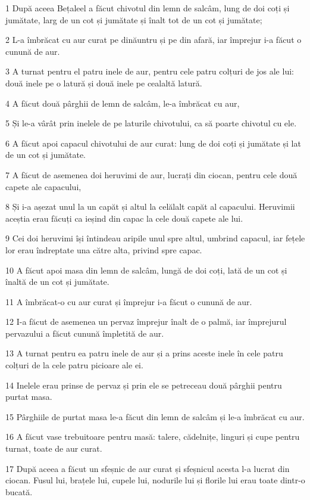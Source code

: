 \par 1 După aceea Bețaleel a făcut chivotul din lemn de salcâm, lung de doi coți și jumătate, larg de un cot și jumătate și înalt tot de un cot și jumătate;
\par 2 L-a îmbrăcat cu aur curat pe dinăuntru și pe din afară, iar împrejur i-a făcut o cunună de aur.
\par 3 A turnat pentru el patru inele de aur, pentru cele patru colțuri de jos ale lui: două inele pe o latură și două inele pe cealaltă latură.
\par 4 A făcut două pârghii de lemn de salcâm, le-a îmbrăcat cu aur,
\par 5 Și le-a vârât prin inelele de pe laturile chivotului, ca să poarte chivotul cu ele.
\par 6 A făcut apoi capacul chivotului de aur curat: lung de doi coți și jumătate și lat de un cot și jumătate.
\par 7 A făcut de asemenea doi heruvimi de aur, lucrați din ciocan, pentru cele două capete ale capacului,
\par 8 Și i-a așezat unul la un capăt și altul la celălalt capăt al capacului. Heruvimii aceștia erau făcuți ca ieșind din capac la cele două capete ale lui.
\par 9 Cei doi heruvimi își întindeau aripile unul spre altul, umbrind capacul, iar fețele lor erau îndreptate una către alta, privind spre capac.
\par 10 A făcut apoi masa din lemn de salcâm, lungă de doi coți, lată de un cot și înaltă de un cot și jumătate.
\par 11 A îmbrăcat-o cu aur curat și împrejur i-a făcut o cunună de aur.
\par 12 I-a făcut de asemenea un pervaz împrejur înalt de o palmă, iar împrejurul pervazului a făcut cunună împletită de aur.
\par 13 A turnat pentru ea patru inele de aur și a prins aceste inele în cele patru colțuri de la cele patru picioare ale ei.
\par 14 Inelele erau prinse de pervaz și prin ele se petreceau două pârghii pentru purtat masa.
\par 15 Pârghiile de purtat masa le-a făcut din lemn de salcâm și le-a îmbrăcat cu aur.
\par 16 A făcut vase trebuitoare pentru masă: talere, cădelnițe, linguri și cupe pentru turnat, toate de aur curat.
\par 17 După aceea a făcut un sfeșnic de aur curat și sfeșnicul acesta l-a lucrat din ciocan. Fusul lui, brațele lui, cupele lui, nodurile lui și florile lui erau toate dintr-o bucată.
